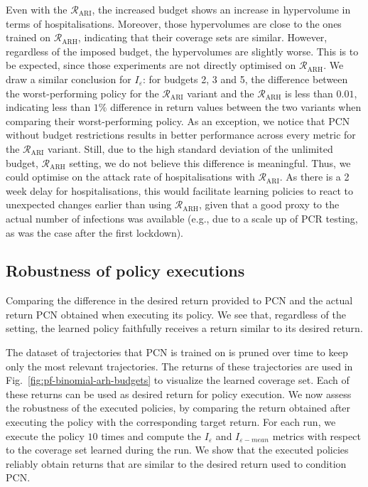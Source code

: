 \documentclass{article}
\newcommand{\mdprewardfn}{\mathcal{R}}
\begin{document}
Even with the $\mdprewardfn_\text{ARI}$, the increased budget shows an increase in hypervolume in terms of hospitalisations. Moreover, those hypervolumes are close to the ones trained on $\mdprewardfn_\text{ARH}$, indicating that their coverage sets are similar. However, regardless of the imposed budget, the hypervolumes are slightly worse. This is to be expected, since those experiments are not directly optimised on $\mdprewardfn_\text{ARH}$. We draw a similar conclusion for $I_\varepsilon$: for budgets 2, 3 and 5, the difference between the worst-performing policy for the $\mdprewardfn_\text{ARI}$ variant and the $\mdprewardfn_\text{ARH}$ is less than $0.01$, indicating less than $1\%$ difference in return values between the two variants when comparing their worst-performing policy. As an exception, we notice that PCN without budget restrictions results in better performance across every metric for the $\mdprewardfn_\text{ARI}$ variant. Still, due to the high standard deviation of the unlimited budget, $\mdprewardfn_\text{ARH}$ setting, we do not believe this difference is meaningful. Thus, we could optimise on the attack rate of hospitalisations with $\mdprewardfn_\text{ARI}$. As there is a 2 week delay for hospitalisations, this would facilitate learning policies to react to unexpected changes earlier than using $\mdprewardfn_\text{ARH}$, given that a good proxy to the actual number of infections was available (e.g., due to a scale up of PCR testing, as was the case after the first lockdown).

\subsection{Robustness of policy executions}
\label{sec:pcn-robustness}

\begin{table}
    \centering
    \setlength{\tabcolsep}{0.5em} %
    {\renewcommand{\arraystretch}{1.2}%
    
    }
    \caption{Comparing the difference in the desired return provided to PCN and the actual return PCN obtained when executing its policy. We see that, regardless of the setting, the learned policy faithfully receives a return similar to its desired return.}
    \label{tab:pcn-robustness}
\end{table}

The dataset of trajectories that PCN is trained on is pruned over time to keep only the most relevant trajectories. The returns of these trajectories are used in Fig.~\ref{fig:pf-binomial-arh-budgets} to visualize the learned coverage set. Each of these returns can be used as desired return for policy execution. We now assess the robustness of the executed policies, by comparing the return obtained after executing the policy with the corresponding target return. For each run, we execute the policy $10$ times and compute the $I_\varepsilon$ and $I_{\varepsilon-mean}$ metrics with respect to the coverage set learned during the run. We show that the executed policies reliably obtain returns that are similar to the desired return used to condition PCN.
\end{document}
